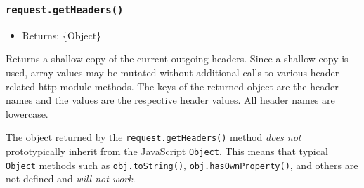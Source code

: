 \begin{Shaded}
\begin{Highlighting}[]
\NormalTok{(}\OperatorTok{,} \NormalTok{)}\OperatorTok{;}
\NormalTok{(}\OperatorTok{,}\NormalTok{ [}\OperatorTok{,} \NormalTok{])}\OperatorTok{;}

\OperatorTok{=}\NormalTok{()}\OperatorTok{;}
\end{Highlighting}
\end{Shaded}

\subsubsection{\texorpdfstring{\texttt{request.getHeaders()}}{request.getHeaders()}}\label{request.getheaders}

\begin{itemize}
\tightlist
\item
  Returns: \{Object\}
\end{itemize}

Returns a shallow copy of the current outgoing headers. Since a shallow
copy is used, array values may be mutated without additional calls to
various header-related http module methods. The keys of the returned
object are the header names and the values are the respective header
values. All header names are lowercase.

The object returned by the \texttt{request.getHeaders()} method
\emph{does not} prototypically inherit from the JavaScript
\texttt{Object}. This means that typical \texttt{Object} methods such as
\texttt{obj.toString()}, \texttt{obj.hasOwnProperty()}, and others are
not defined and \emph{will not work}.

